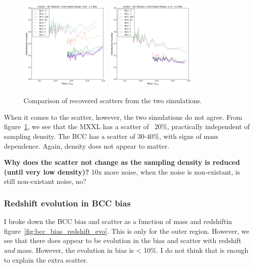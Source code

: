 \documentclass[11pt]{article}
\begin{document}
\begin{figure} \centering
\includegraphics[width=0.4\textwidth]{figures/density_cfree-r5_scatter}
\includegraphics[width=0.4\textwidth]{figures/density_cfree-r10_scatter}
\caption{Comparison of recovered scatters from the two simulations.}
\label{fig:bcc_vs_mxxl_density_scatter}
\end{figure}

When it comes to the scatter, however, the two simulations do not agree. From figure~\ref{fig:bcc_vs_mxxl_density_scatter}, we see that the MXXL has a scatter of ~20\%, practically independent of sampling density. The BCC has a scatter of 30-40\%, with signs of mass dependence. Again, density does not appear to matter. 

\textbf{Why does the scatter not change as the sampling density is reduced (until very low density)?}
10x more noise, when the noise is non-existant, is still non-existant noise, no?

\subsubsection{Redshift evolution in BCC bias}

I broke down the BCC bias and scatter as a function of mass and redshiftin figure~\ref{fig:bcc_bias_redshift_evo}. This is only for the outer region. However, we see that there does appear to be evolution in the bias and scatter with redshift \emph{and} mass. However, the evolution in bias is < 10\%. I do not think that is enough to explain the extra scatter.
\end{document}
